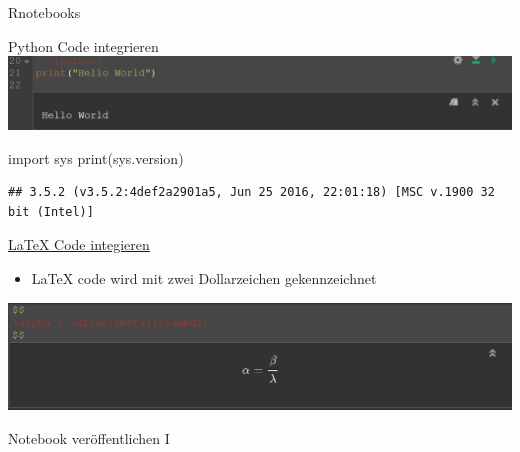 \documentclass[ignorenonframetext,]{beamer}
\newenvironment{Shaded}{}{}
\newcommand{\ImportTok}[1]{{#1}}
\newcommand{\BuiltInTok}[1]{{#1}}
\newcommand{\NormalTok}[1]{{#1}}
\providecommand{\tightlist}{%
\setlength{\itemsep}{0pt}\setlength{\parskip}{0pt}}
\begin{document}
\begin{frame}[fragile]{Rnotebooks}
\begin{block}{Python Code integrieren}
\includegraphics{./tex2pdf.9796/e34ce4ae055b28f5d5589f20831af0133977e345.png}

\begin{Shaded}
\begin{Highlighting}[]
\ImportTok{import} \NormalTok{sys}
\BuiltInTok{print}\NormalTok{(sys.version)}
\end{Highlighting}
\end{Shaded}

\begin{verbatim}
## 3.5.2 (v3.5.2:4def2a2901a5, Jun 25 2016, 22:01:18) [MSC v.1900 32 bit (Intel)]
\end{verbatim}

\end{block}

\begin{block}{\href{https://blog.rstudio.org/2016/10/05/r-notebooks/}{LaTeX
Code integieren}}

\begin{itemize}
\tightlist
\item
  LaTeX code wird mit zwei Dollarzeichen gekennzeichnet
\end{itemize}

\includegraphics{./tex2pdf.9796/18003bb3eb50842bc98ffd9054f093288bfcbcf5.png}

\end{block}

\begin{block}{Notebook veröffentlichen I}


\end{block}
\end{frame}
\end{document}
